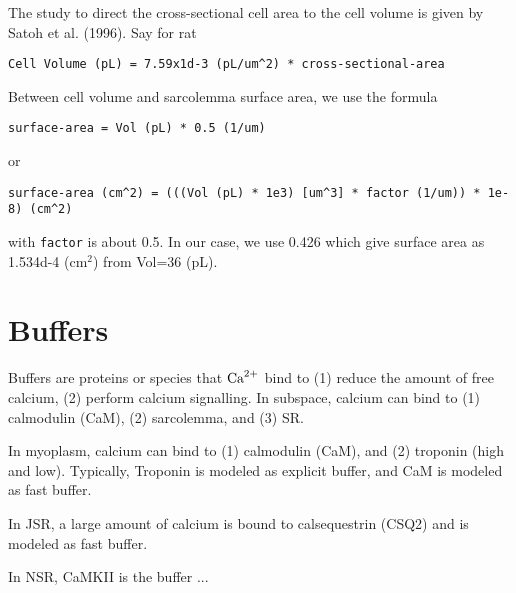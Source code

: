 The study to direct the cross-sectional cell area to the cell volume
is given by Satoh et al. (1996). Say for rat
\begin{verbatim}
Cell Volume (pL) = 7.59x1d-3 (pL/um^2) * cross-sectional-area
\end{verbatim}
Between cell volume and sarcolemma surface area, we use the
formula~\citep{page1978}
\begin{verbatim}
surface-area = Vol (pL) * 0.5 (1/um)
\end{verbatim}
or
\begin{verbatim}
surface-area (cm^2) = (((Vol (pL) * 1e3) [um^3] * factor (1/um)) * 1e-8) (cm^2)
\end{verbatim}
with \verb!factor! is about 0.5. In our case, we use 0.426 which give surface
area as 1.534d-4 (cm$^2$) from Vol=36 (pL).



\section{Buffers}
\label{sec:buffers}

Buffers are proteins or species that ${\text{Ca}^{2+}}$ bind to (1) reduce the amount of free
calcium, (2) perform calcium signalling. In subspace, calcium can bind
to (1) calmodulin (CaM), (2) sarcolemma, and (3) SR.

In myoplasm, calcium can bind to (1) calmodulin (CaM), and (2) troponin (high
and low). Typically, Troponin is modeled as explicit buffer, and CaM is modeled
as fast buffer.

In JSR, a large amount of calcium is bound to calsequestrin (CSQ2) and is
modeled as fast buffer. 

In NSR, CaMKII is the buffer ...


